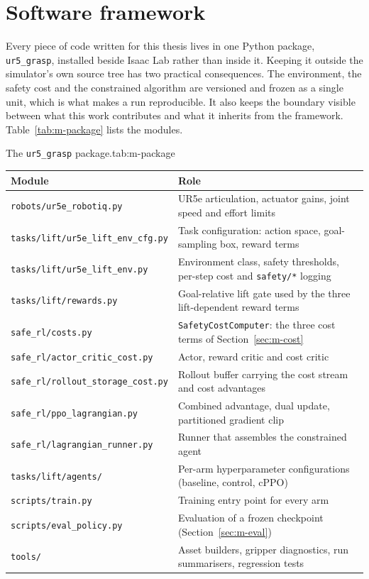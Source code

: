 \section{Software framework}\label{sec:m-software}

Every piece of code written for this thesis lives in one Python package, \texttt{ur5\_grasp},
installed beside Isaac Lab rather than inside it. Keeping it outside the simulator's own source
tree has two practical consequences. The environment, the safety cost and the constrained
algorithm are versioned and frozen as a single unit, which is what makes a run reproducible. It also
keeps the boundary visible between what this work contributes and what it inherits from the
framework. Table~\ref{tab:m-package} lists the modules.

\begin{kuettable}{The \texttt{ur5\_grasp} package.}{tab:m-package}
\begin{tabular*}{\textwidth}{@{\extracolsep{\fill}}p{}p{}}
\toprule
Module & Role\\
\midrule
\texttt{robots/ur5e\_robotiq.py} & UR5e articulation, actuator gains, joint speed and effort limits\\
\texttt{tasks/lift/ur5e\_lift\_env\_cfg.py} & Task configuration: action space, goal-sampling box, reward terms\\
\texttt{tasks/lift/ur5e\_lift\_env.py} & Environment class, safety thresholds, per-step cost and \texttt{safety/*} logging\\
\texttt{tasks/lift/rewards.py} & Goal-relative lift gate used by the three lift-dependent reward terms\\
\texttt{safe\_rl/costs.py} & \texttt{SafetyCostComputer}: the three cost terms of Section~\ref{sec:m-cost}\\
\texttt{safe\_rl/actor\_critic\_cost.py} & Actor, reward critic and cost critic\\
\texttt{safe\_rl/rollout\_storage\_cost.py} & Rollout buffer carrying the cost stream and cost advantages\\
\texttt{safe\_rl/ppo\_lagrangian.py} & Combined advantage, dual update, partitioned gradient clip\\
\texttt{safe\_rl/lagrangian\_runner.py} & Runner that assembles the constrained agent\\
\texttt{tasks/lift/agents/} & Per-arm hyperparameter configurations (baseline, control, cPPO)\\
\texttt{scripts/train.py} & Training entry point for every arm\\
\texttt{scripts/eval\_policy.py} & Evaluation of a frozen checkpoint (Section~\ref{sec:m-eval})\\
\texttt{tools/} & Asset builders, gripper diagnostics, run summarisers, regression tests\\
\bottomrule
\end{tabular*}
\end{kuettable}

